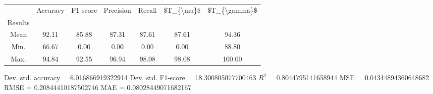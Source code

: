 \begin{tabular}{|c|c|c|c|c|c|c|}
\toprule
{} &  Accuracy &  F1 score &  Precision &  Recall &  \$T\_\{\textbackslash mu\}\$ &  \$T\_\{\textbackslash gamma\}\$ \\
Results &           &           &            &         &            &               \\
\hline
Mean    &     92.11 &     85.88 &      87.31 &   87.61 &      87.61 &         94.36 \\
Min.    &     66.67 &      0.00 &       0.00 &    0.00 &       0.00 &         88.80 \\
Max.    &     94.84 &     92.55 &      96.94 &   98.08 &      98.08 &        100.00 \\
\bottomrule
\end{tabular}

 Dev. std. accuracy = 6.016866919322914
 Dev. std. F1-score = 18.300805077700463
 $R^2$ = 0.8044795141658944
 MSE = 0.04344894360648682
 RMSE = 0.20844410187502746
 MAE = 0.08028449071682167